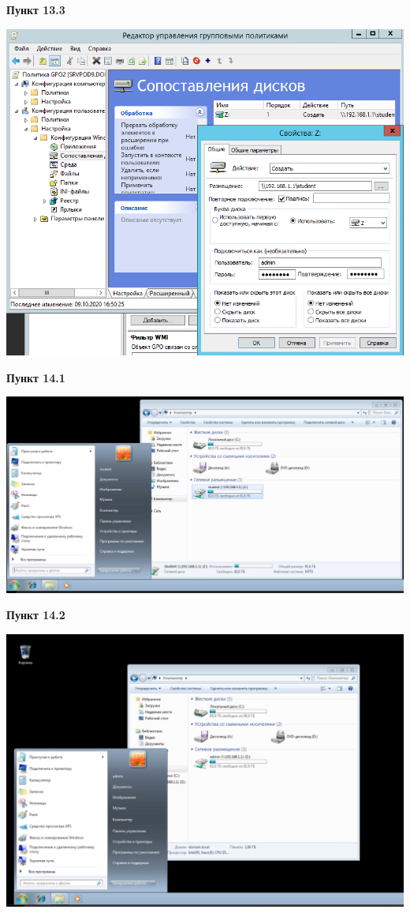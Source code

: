 \documentclass[a4paper,14pt]{extarticle}
\begin{document}
    \newpage
    \textbf{Пункт 13.3}
    \begin{center}
        \includegraphics[scale=0.6]{13.3}
    \end{center}
    \textbf{Пункт 14.1}
    \begin{center}
        \includegraphics[scale=0.4]{14.1}
    \end{center}
    \newpage
    \textbf{Пункт 14.2}
    \begin{center}
        \includegraphics[scale=0.4]{14.2}
    \end{center}
\end{document}
